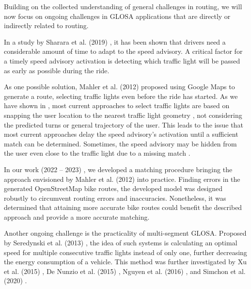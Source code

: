 Building on the collected understanding of general challenges in routing, we will now focus on ongoing challenges in GLOSA applications that are directly or indirectly related to routing.

In a study by Sharara et al. (2019) \cite{sharara_impact_2019}, it has been shown that drivers need a considerable amount of time to adapt to the speed advisory. A critical factor for a timely speed advisory activation is detecting which traffic light will be passed as early as possible during the ride. 

As one possible solution, Mahler et al. (2012) \cite{mahler_reducing_2012} proposed using Google Maps to generate a route, selecting traffic lights even before the ride has started. As we have shown in , most current approaches to select traffic lights are based on snapping the user location to the nearest traffic light geometry \cite{katsaros_performance_2011, bernais_design_2016, wilson_driver_2017, stahlmann_exploring_2018, bhattacharyya_assessing_2022}, not considering the predicted turns or general trajectory of the user. This leads to the issue that most current approaches delay the speed advisory's activation until a sufficient match can be determined. Sometimes, the speed advisory may be hidden from the user even close to the traffic light due to a missing match \cite{wilson_driver_2017, stahlmann_exploring_2018}.

In our work (2022 -- 2023) \cite{matthes2022matching, matthes2023geo}, we developed a matching procedure bringing the approach envisioned by Mahler et al. (2012) \cite{mahler_reducing_2012} into practice. Finding errors in the generated OpenStreetMap bike routes, the developed model was designed robustly to circumvent routing errors and inaccuracies. Nonetheless, it was determined that attaining more accurate bike routes could benefit the described approach and provide a more accurate matching.

Another ongoing challenge is the practicality of multi-segment GLOSA. Proposed by Seredynski et al. (2013) \cite{seredynski_comparison_2013, seredynski_multi-segment_2013}, the idea of such systems is calculating an optimal speed for multiple consecutive traffic lights instead of only one, further decreasing the energy consumption of a vehicle. This method was further investigated by Xu et al. (2015) \cite{xu_bb_2015}, De Nunzio et al. (2015) \cite{de_nunzio_eco-driving_2015}, Nguyen et al. (2016) \cite{nguyen_efficient_2016}, and Simchon et al. (2020) \cite{simchon_real-time_2020}. 

